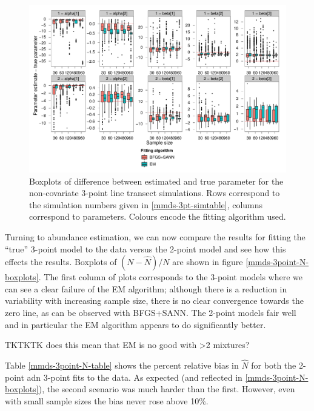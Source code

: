 \begin{figure}
\centering
\includegraphics[width=7in]{mix/figs/3point-boxplots.pdf}
\caption{Boxplots of difference between estimated and true parameter for the non-covariate 3-point line transect simulations. Rows correspond to the simulation numbers given in \ref{mmds-3pt-simtable}, columns correspond to parameters. Colours encode the fitting algorithm used.}
\label{mmds-3point-boxplots}
\end{figure}

Turning to abundance estimation, we can now compare the results for fitting the ``true'' 3-point model to the data versus the 2-point model and see how this effects the results. Boxplots of $(N-\hat{N})/N$ are shown in figure \ref{mmds-3point-N-boxplots}. The first column of plots corresponds to the 3-point models where we can see a clear failure of the EM algorithm; although there is a reduction in variability with increasing sample size, there is no clear convergence towards the zero line, as can be observed with BFGS+SANN. The 2-point models fair well and in particular the EM algorithm appears to do significantly better. 

TKTKTK does this mean that EM is no good with >2 mixtures?

Table \ref{mmds-3point-N-table} shows the percent relative bias in $\hat{N}$ for both the 2-point adn 3-point fits to the data. As expected (and reflected in \ref{mmds-3point-N-boxplots}), the second scenario was much harder than the first. However, even with small sample sizes the bias never rose above 10\%.


